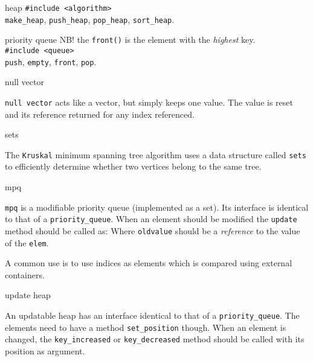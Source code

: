 \begin{algorithm}{heap}
\usage{}
{\tt \#include <algorithm>}\\
{\tt make\_heap}, {\tt push\_heap}, {\tt pop\_heap}, {\tt sort\_heap}.
\end{algorithm}

\begin{algorithm}{priority queue}
NB! the {\tt front()} is the element with the {\em highest} key.\\
\usage{}
{\tt \#include <queue>}\\
{\tt push}, {\tt empty}, {\tt front}, {\tt pop}.
\end{algorithm}

\begin{algorithm}{null vector}

{\tt null vector} acts like a vector, but simply keeps one value.
The value is reset and its reference returned for any index referenced.
\end{algorithm}

\begin{algorithm}{sets}

The {\tt Kruskal} minimum spanning tree algorithm uses a data structure
called {\tt sets} to efficiently determine whether two vertices belong to
the same tree.
\end{algorithm}

\begin{algorithm}{mpq}

{\tt mpq} is a modifiable priority queue (implemented as a set). Its interface
is identical to that of a {\tt priority\_queue}. When an element should be
modified the {\tt update} method should be called as:
Where {\tt oldvalue} should be a \emph{reference} to the value of the
{\tt elem}.

A common use is to use indices as elements which is compared using external
containers.
\end{algorithm}

\begin{algorithm}{update heap}

An updatable heap has an interface identical to that of a
{\tt priority\_queue}.
The elements need to have a method {\tt set\_position} though. When an element
is changed, the {\tt key\_increased} or {\tt key\_decreased} method should
be called with its position as argument.
\end{algorithm}

\begin{sourceslandscape}
\end{sourceslandscape}
